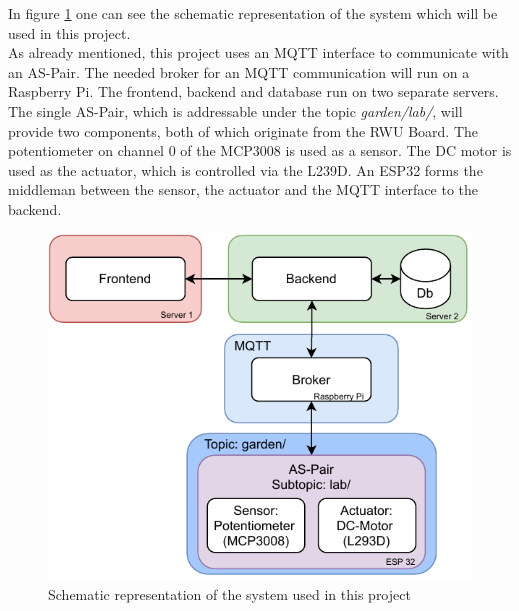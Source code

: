\newpage

In figure \ref{fig:hardware_conc_system} one can see the schematic representation of the system which will be used in this project.\\

As already mentioned, this project uses an MQTT interface to communicate with an AS-Pair. The needed broker for an MQTT communication will run on a Raspberry Pi. The frontend, backend and database run on two separate servers.\\

The single AS-Pair, which is addressable under the topic \textit{garden/lab/}, will provide two components, both of which originate from the RWU Board. The potentiometer on channel 0 of the MCP3008 is used as a sensor. The DC motor is used as the actuator, which is controlled via the L239D. An ESP32 forms the middleman between the sensor, the actuator and the MQTT interface to the backend.

\vspace{5mm}
\begin{figure}[H]
    \centering
    \includegraphics[width=.65\textwidth]{images/4_1/implemented.pdf}
    \caption{Schematic representation of the system used in this project}
    \label{fig:hardware_conc_system}
\end{figure}
